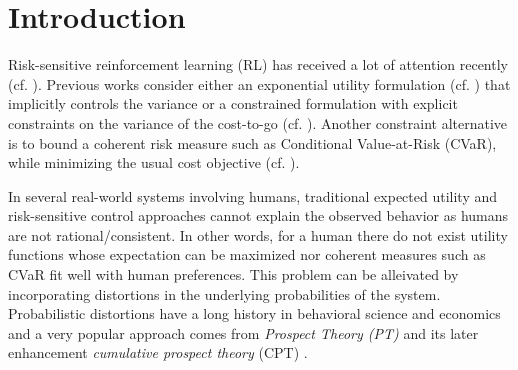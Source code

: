 \documentclass[11pt,letterpaper,english]{article}
\begin{document}



\section{Introduction}
\label{sec:introduction}
Risk-sensitive reinforcement learning (RL) has received a lot of attention recently (cf. \cite{borkar2010learning,borkar2010risk,tamar2012policy,Prashanth13AC}). Previous works consider either an exponential utility formulation (cf. \cite{borkar2010learning}) that implicitly controls the variance or a constrained formulation with explicit constraints on the variance of the cost-to-go (cf. \cite{tamar2012policy,Prashanth13AC}). Another constraint alternative is to bound a coherent risk measure such as Conditional Value-at-Risk (CVaR), while minimizing the usual cost objective (cf. \cite{borkar2010risk,prashanth2014policy}).  

In several real-world systems involving humans, traditional expected utility and risk-sensitive control approaches cannot explain the observed behavior as humans are not rational/consistent. In other words, for a human there do not exist utility functions whose expectation can be maximized nor coherent measures such as CVaR fit well with human preferences. This problem can be alleivated by incorporating distortions in the underlying probabilities of the system. Probabilistic distortions have a long history in behavioral science and economics and a very popular approach comes from \textit{Prospect Theory (PT)} \cite{kahneman1979prospect} and its later enhancement \textit{cumulative prospect theory} (CPT) \cite{tversky1992advances}. 
\end{document}
